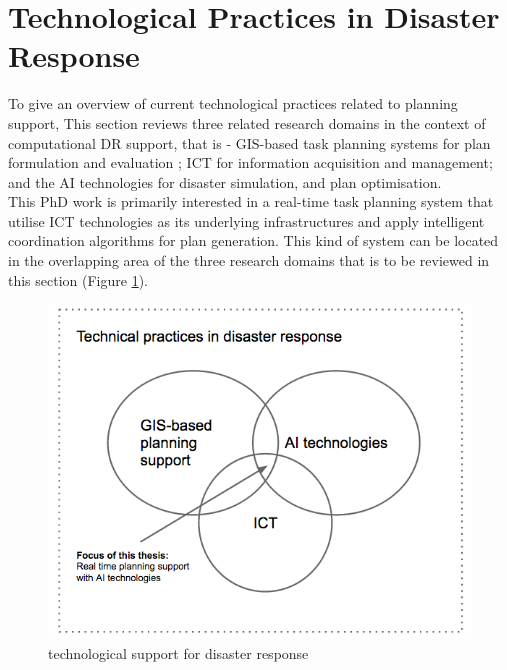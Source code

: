 \section{Technological Practices in Disaster Response} \label{sec:LRApplicationAreas}
To give an overview of current technological practices related to planning support, This section reviews three related research domains in the context of computational DR support, that is - \ac{GIS}-based task planning systems for plan formulation and evaluation ; \acf{ICT} for information acquisition and management; and the \acf{AI} technologies for disaster simulation, and plan optimisation.  \\

This PhD work is primarily interested in a real-time task planning system that utilise \ac{ICT} technologies as its underlying infrastructures and apply intelligent coordination algorithms for plan generation. This kind of system can be located in the overlapping area of the three research domains that is to be reviewed in this section (Figure \ref{fig:SystemFraming}).\\

\begin{figure}[h]
  \centering
  \includegraphics[width=1\textwidth]{img/Background/SystemFraming}
  \caption{technological support for disaster response}
  \label{fig:SystemFraming}
\end{figure} 

